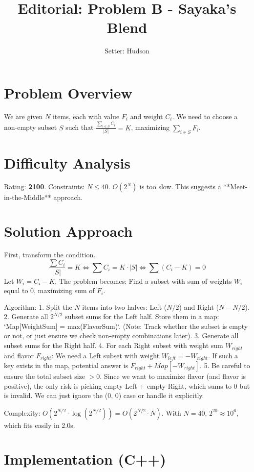 \documentclass[11pt]{article}
\title{\textbf{Editorial: Problem B - Sayaka's Blend}}
\author{Setter: Hudson}
\date{}
\begin{document}
\maketitle

\section*{Problem Overview}
We are given $N$ items, each with value $F_i$ and weight $C_i$. We need to choose a non-empty subset $S$ such that $\frac{\sum_{i \in S} C_i}{|S|} = K$, maximizing $\sum_{i \in S} F_i$.

\section*{Difficulty Analysis}
Rating: \textbf{2100}.
Constraints: $N \le 40$. $O(2^N)$ is too slow.
This suggests a **Meet-in-the-Middle** approach.

\section*{Solution Approach}
First, transform the condition.
$$ \frac{\sum C_i}{|S|} = K \iff \sum C_i = K \cdot |S| \iff \sum (C_i - K) = 0 $$
Let $W_i = C_i - K$. The problem becomes: Find a subset with sum of weights $W_i$ equal to 0, maximizing sum of $F_i$.

Algorithm:
1. Split the $N$ items into two halves: Left ($N/2$) and Right ($N - N/2$).
2. Generate all $2^{N/2}$ subset sums for the Left half. Store them in a map: `Map[WeightSum] = max(FlavorSum)`.
   (Note: Track whether the subset is empty or not, or just ensure we check non-empty combinations later).
3. Generate all subset sums for the Right half.
4. For each Right subset with weight sum $W_{right}$ and flavor $F_{right}$:
   We need a Left subset with weight $W_{left} = -W_{right}$.
   If such a key exists in the map, potential answer is $F_{right} + Map[-W_{right}]$.
5. Be careful to ensure the total subset size $> 0$. Since we want to maximize flavor (and flavor is positive), the only risk is picking empty Left + empty Right, which sums to 0 but is invalid. We can just ignore the (0, 0) case or handle it explicitly.

Complexity: $O(2^{N/2} \cdot \log(2^{N/2})) = O(2^{N/2} \cdot N)$. With $N=40$, $2^{20} \approx 10^6$, which fits easily in 2.0s.

\newpage
\section*{Implementation (C++)}
\end{document}
